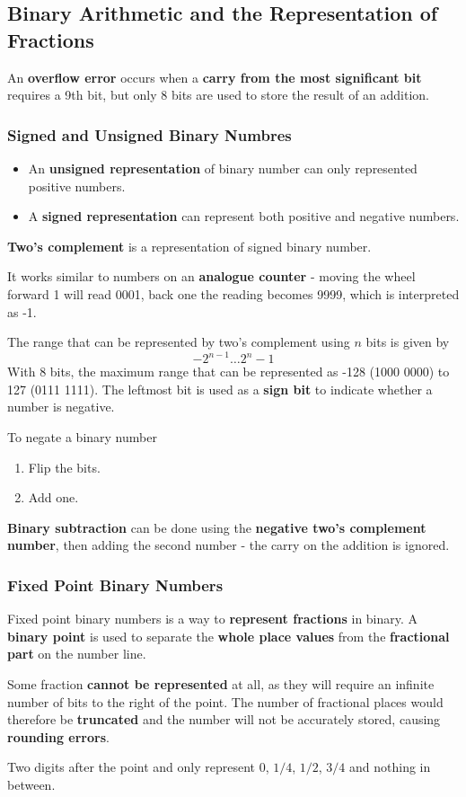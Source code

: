 \subsection{Binary Arithmetic and the Representation of Fractions}

An \textbf{overflow error} occurs when a \textbf{carry from the most significant bit} requires a 9th bit, but only 8 bits are used to store the result of an addition.

\subsubsection*{Signed and Unsigned Binary Numbres}

\begin{itemize}
    \item An \textbf{unsigned representation} of binary number can only represented positive numbers.
    \item A \textbf{signed representation} can represent both positive and negative numbers.
\end{itemize}

\textbf{Two's complement} is a representation of signed binary number.

It works similar to numbers on an \textbf{analogue counter} - moving the wheel forward 1 will read 0001, back one the reading becomes 9999, which is interpreted as -1.

The range that can be represented by two's complement using $n$ bits is given by
$$-2^{n-1}\dots 2^n-1$$
With 8 bits, the maximum range that can be represented as -128 (1000 0000) to 127 (0111 1111). The leftmost bit is used as a \textbf{sign bit} to indicate whether a number is negative.

To negate a binary number
\begin{enumerate}
    \item Flip the bits.
    \item Add one.
\end{enumerate}

\textbf{Binary subtraction} can be done using the \textbf{negative two's complement number}, then adding the second number - the carry on the addition is ignored.

\subsubsection*{Fixed Point Binary Numbers}

Fixed point binary numbers is a way to \textbf{represent fractions} in binary. A \textbf{binary point} is used to separate the \textbf{whole place values} from the \textbf{fractional part} on the number line.

Some fraction \textbf{cannot be represented} at all, as they will require an infinite number of bits to the right of the point. The number of fractional places would therefore be \textbf{truncated} and the number will not be accurately stored, causing \textbf{rounding errors}.

Two digits after the point and only represent 0, $1/4$, $1/2$, $3/4$ and nothing in between.
